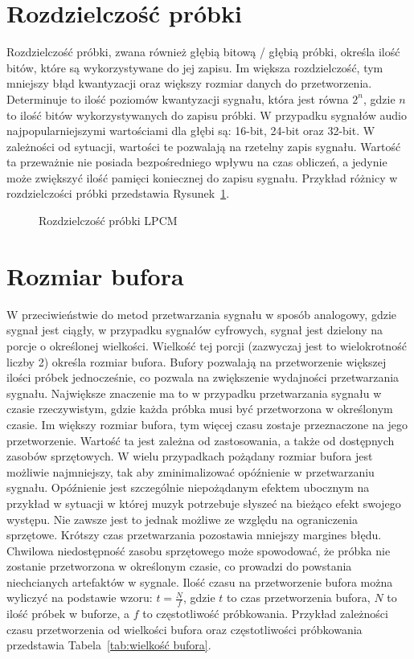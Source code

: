 \section{Rozdzielczość próbki}
Rozdzielczość próbki, zwana również głębią bitową / głębią próbki, określa ilość bitów, które są wykorzystywane do jej zapisu. Im większa rozdzielczość, tym mniejszy błąd kwantyzacji oraz większy rozmiar danych do przetworzenia. Determinuje to ilość poziomów kwantyzacji sygnału, która jest równa $2^n$, gdzie $n$ to ilość bitów wykorzystywanych do zapisu próbki. W przypadku sygnałów audio najpopularniejszymi wartościami dla głębi są: 16-bit, 24-bit oraz 32-bit. W zależności od sytuacji, wartości te pozwalają na rzetelny zapis sygnału. Wartość ta przeważnie nie posiada bezpośredniego wpływu na czas obliczeń, a jedynie może zwiększyć ilość pamięci koniecznej do zapisu sygnału. Przykład różnicy w rozdzielczości próbki przedstawia Rysunek~\ref{fig:Rozdzielczość próbki LPCM}.
\begin{figure}[H]
    \centering
    \scalebox{1.0}{}
    \caption{Rozdzielczość próbki LPCM}
    \label{fig:Rozdzielczość próbki LPCM}
\end{figure}


\section{Rozmiar bufora}
W przeciwieństwie do metod przetwarzania sygnału w sposób analogowy, gdzie sygnał jest ciągły, w przypadku sygnałów cyfrowych, sygnał jest dzielony na porcje o określonej wielkości. Wielkość tej porcji (zazwyczaj jest to wielokrotność liczby 2) określa rozmiar bufora. Bufory pozwalają na przetworzenie większej ilości próbek jednocześnie, co pozwala na zwiększenie wydajności przetwarzania sygnału. Największe znaczenie ma to w przypadku przetwarzania sygnału w czasie rzeczywistym, gdzie każda próbka musi być przetworzona w określonym czasie. Im większy rozmiar bufora, tym więcej czasu zostaje przeznaczone na jego przetworzenie. Wartość ta jest zależna od zastosowania, a także od dostępnych zasobów sprzętowych. W wielu przypadkach pożądany rozmiar bufora jest możliwie najmniejszy, tak aby zminimalizować opóźnienie w przetwarzaniu sygnału. Opóźnienie jest szczególnie niepożądanym efektem ubocznym na przykład w sytuacji w której muzyk potrzebuje słyszeć na bieżąco efekt swojego występu. Nie zawsze jest to jednak możliwe ze względu na ograniczenia sprzętowe. Krótszy czas przetwarzania pozostawia mniejszy margines błędu. Chwilowa niedostępność zasobu sprzętowego może spowodować, że próbka nie zostanie przetworzona w określonym czasie, co prowadzi do powstania niechcianych artefaktów w sygnale. Ilość czasu na przetworzenie bufora można wyliczyć na podstawie wzoru: $t = \frac{N}{f}$, gdzie $t$ to czas przetworzenia bufora, $N$ to ilość próbek w buforze, a $f$ to częstotliwość próbkowania. Przykład zależności czasu przetworzenia od wielkości bufora oraz częstotliwości próbkowania przedstawia Tabela~\ref{tab:wielkość bufora}.

